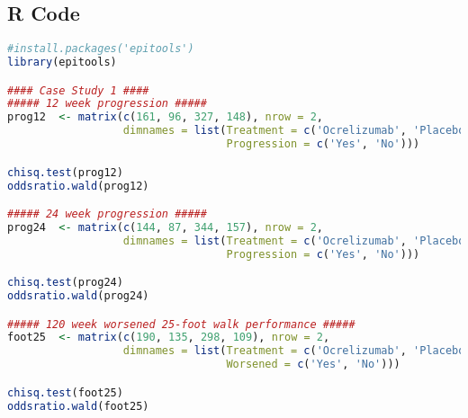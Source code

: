 \documentclass{article}
\begin{document}
	\subsection*{R Code}

\begin{lstlisting}[language=R, caption={R code for analyzing progression and walk performance in Ocrelizumab treatment}, label={lst:rcode}]
#install.packages('epitools')
library(epitools)

#### Case Study 1 ####
##### 12 week progression #####
prog12  <- matrix(c(161, 96, 327, 148), nrow = 2, 
                  dimnames = list(Treatment = c('Ocrelizumab', 'Placebo'), 
                                  Progression = c('Yes', 'No')))

chisq.test(prog12)
oddsratio.wald(prog12)

##### 24 week progression #####
prog24  <- matrix(c(144, 87, 344, 157), nrow = 2, 
                  dimnames = list(Treatment = c('Ocrelizumab', 'Placebo'), 
                                  Progression = c('Yes', 'No')))

chisq.test(prog24)
oddsratio.wald(prog24)

##### 120 week worsened 25-foot walk performance #####
foot25  <- matrix(c(190, 135, 298, 109), nrow = 2, 
                  dimnames = list(Treatment = c('Ocrelizumab', 'Placebo'), 
                                  Worsened = c('Yes', 'No')))

chisq.test(foot25)
oddsratio.wald(foot25)
\end{lstlisting}




	\newpage
\end{document}
